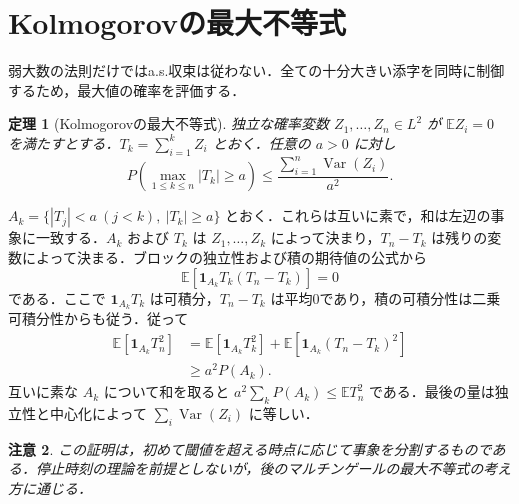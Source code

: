 \documentclass[a5paper,10pt,onecolumn]{jsarticle}
\makeatletter
\theoremstyle{mathnotetheorem}
\newtheorem{theorem}{定理}[section]
\newtheorem{remark}[theorem]{注意}
\renewcommand{\proofname}{証明}
\renewenvironment{proof}[1][\proofname]{%
  \par\pushQED{\qed}\normalfont\topsep4\p@\@plus2\p@\relax
  \trivlist\item[\hskip\labelsep\bfseries #1]\ignorespaces
}{\popQED\endtrivlist\@endpefalse}
\newcommand{\E}{\mathbb E}
\newcommand{\1}{\mathbf{1}}
\DeclareMathOperator{\Var}{Var}
\makeatother
\begin{document}
\section{Kolmogorovの最大不等式}
弱大数の法則だけではa.s.収束は従わない．全ての十分大きい添字を同時に制御するため，最大値の確率を評価する．
\begin{theorem}[Kolmogorovの最大不等式]\label{maxineq}
独立な確率変数 $Z_1,\ldots,Z_n\in L^2$ が $\E Z_i=0$ を満たすとする．$T_k=\sum_{i=1}^k Z_i$ とおく．任意の $a>0$ に対し
\[
 P\left(\max_{1\le k\le n}|T_k|\ge a\right)
 \le\frac{\sum_{i=1}^n\Var(Z_i)}{a^2}.
\]
\end{theorem}
\begin{proof}
$A_k=\{|T_j|<a\ (j<k),\ |T_k|\ge a\}$ とおく．これらは互いに素で，和は左辺の事象に一致する．$A_k$ および $T_k$ は $Z_1,\ldots,Z_k$ によって決まり，$T_n-T_k$ は残りの変数によって決まる．ブロックの独立性および積の期待値の公式から
\[
 \E[\1_{A_k}T_k(T_n-T_k)]=0
\]
である．ここで $\1_{A_k}T_k$ は可積分，$T_n-T_k$ は平均0であり，積の可積分性は二乗可積分性からも従う．従って
\begin{align*}
 \E[\1_{A_k}T_n^2]
 &=\E[\1_{A_k}T_k^2]+\E[\1_{A_k}(T_n-T_k)^2]\\
 &\ge a^2P(A_k).
\end{align*}
互いに素な $A_k$ について和を取ると $a^2\sum_kP(A_k)\le\E T_n^2$ である．最後の量は独立性と中心化によって $\sum_i\Var(Z_i)$ に等しい．
\end{proof}
\begin{remark}
この証明は，初めて閾値を超える時点に応じて事象を分割するものである．停止時刻の理論を前提としないが，後のマルチンゲールの最大不等式の考え方に通じる．
\end{remark}
\end{document}
